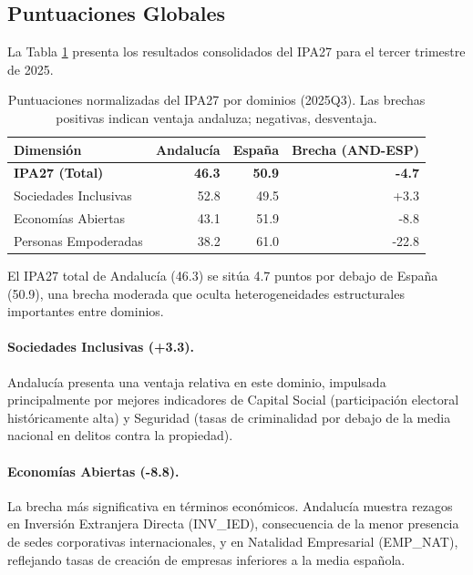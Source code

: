 \documentclass[authoryear,12pt]{elsarticle}
\begin{document}
\subsection{Puntuaciones Globales}

La Tabla \ref{tab:resultados_dominios} presenta los resultados consolidados del IPA27 para el tercer trimestre de 2025.

\begin{table}[h!]
\centering
\begin{tabular}{lrrr}
\toprule
\textbf{Dimensión} & \textbf{Andalucía} & \textbf{España} & \textbf{Brecha (AND-ESP)} \\
\midrule
\textbf{IPA27 (Total)} & \textbf{46.3} & \textbf{50.9} & \textbf{-4.7} \\
\midrule
Sociedades Inclusivas & 52.8 & 49.5 & +3.3 \\
Economías Abiertas & 43.1 & 51.9 & -8.8 \\
Personas Empoderadas & 38.2 & 61.0 & -22.8 \\
\bottomrule
\end{tabular}
\caption{Puntuaciones normalizadas del IPA27 por dominios (2025Q3). Las brechas positivas indican ventaja andaluza; negativas, desventaja.}
\label{tab:resultados_dominios}
\end{table}

El IPA27 total de Andalucía (46.3) se sitúa 4.7 puntos por debajo de España (50.9), una brecha moderada que oculta heterogeneidades estructurales importantes entre dominios.

\paragraph{Sociedades Inclusivas (+3.3).} Andalucía presenta una ventaja relativa en este dominio, impulsada principalmente por mejores indicadores de Capital Social (participación electoral históricamente alta) y Seguridad (tasas de criminalidad por debajo de la media nacional en delitos contra la propiedad).

\paragraph{Economías Abiertas (-8.8).} La brecha más significativa en términos económicos. Andalucía muestra rezagos en Inversión Extranjera Directa (INV\_IED), consecuencia de la menor presencia de sedes corporativas internacionales, y en Natalidad Empresarial (EMP\_NAT), reflejando tasas de creación de empresas inferiores a la media española.
\end{document}
